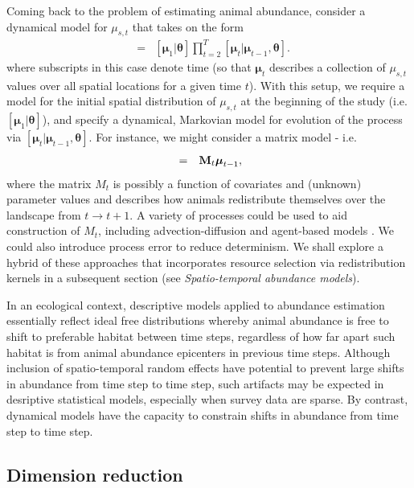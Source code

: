 \documentclass[times,mee,doublespace,]{besauth2}
\begin{document}
Coming back to the problem of estimating animal abundance, consider a dynamical model for $\mu_{s,t}$ that takes on the form
\begin{eqnarray}
  [\boldsymbol{\mu}|\boldsymbol{\theta}] & = & [\boldsymbol{\mu}_1 | \boldsymbol{\theta}] \prod_{t=2}^T [\boldsymbol{\mu}_t | \boldsymbol{\mu}_{t-1},\boldsymbol{\theta}].
  \label{eq:mu}
\end{eqnarray}
where subscripts in this case denote time (so that $\boldsymbol{\mu}_t$ describes a collection of $\mu_{s,t}$ values over all spatial locations for a given time $t$).  With this setup, we require a model for the initial spatial distribution of $\mu_{s,t}$ at the beginning of the study (i.e. $[\boldsymbol{\mu}_1 | \boldsymbol{\theta}]$), and
specify a dynamical, Markovian model for evolution of the process via $[\boldsymbol{\mu}_t | \boldsymbol{\mu}_{t-1},\boldsymbol{\theta}]$.  For instance, we might consider a matrix model - i.e.
\begin{eqnarray}
[\boldsymbol{\mu}_t | \boldsymbol{\mu}_{t-1},\boldsymbol{\theta}] & = & {\bf M}_t  \boldsymbol{\mu}_{t-1},
 \label{eq:matrix-mod}
\end{eqnarray}
where the matrix $M_t$ is possibly a function of covariates and (unknown) parameter values and describes how animals
redistribute themselves over the landscape from $t \rightarrow t+1$.  A variety of processes could be used to aid construction of $M_t$, including advection-diffusion \citep{Wikle2003} and agent-based models \citep{HootenWikle2010}.  We could also introduce process error to reduce determinism.  We shall explore a hybrid of these approaches that incorporates resource selection via redistribution kernels in a subsequent section (see {\it Spatio-temporal abundance models}).

In an ecological context, descriptive models applied to abundance estimation essentially reflect ideal free distributions \citep{FretwellLucas1970} whereby animal abundance is free to shift to preferable habitat between time steps, regardless of how far apart such habitat is from animal abundance epicenters in previous time steps.  Although inclusion of spatio-temporal random effects have potential to prevent large shifts in abundance from time step to time step, such artifacts may be expected in desriptive statistical models, especially when survey data are sparse.  By contrast, dynamical models have the capacity to constrain shifts in abundance from time step to time step.

\subsection{Dimension reduction}
\end{document}
